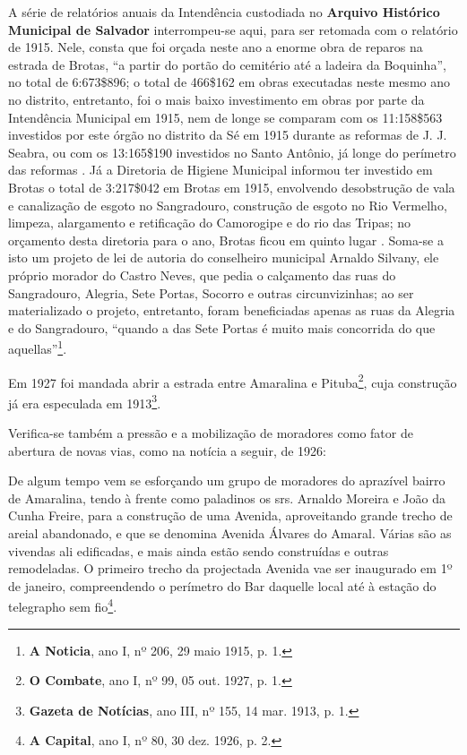 A série de relatórios anuais da Intendência custodiada no \textbf{Arquivo Histórico Municipal de Salvador} interrompeu-se aqui, para ser retomada com o relatório de 1915. Nele, consta que foi orçada neste ano a enorme obra de reparos na estrada de Brotas, “a partir do portão do cemitério até a ladeira da Boquinha”, no total de 6:673\$896; o total de 466\$162 em obras executadas neste mesmo ano no distrito, entretanto, foi o mais baixo investimento em obras por parte da Intendência Municipal em 1915, nem de longe se comparam com os 11:158\$563 investidos por este órgão no distrito da Sé em 1915 durante as reformas de J. J. Seabra, ou com os 13:165\$190 investidos no Santo Antônio, já longe do perímetro das reformas \cite[pp.~127-128]{salvador_relatorio_1916}. Já a Diretoria de Higiene Municipal informou ter investido em Brotas o total de 3:217\$042 em Brotas em 1915, envolvendo desobstrução de vala e canalização de esgoto no Sangradouro, construção de esgoto no Rio Vermelho, limpeza, alargamento e retificação do Camorogipe e do rio das Tripas; no orçamento desta diretoria para o ano, Brotas ficou em quinto lugar \cite[pp.~195-196]{salvador_relatorio_1916}. Soma-se a isto um projeto de lei de autoria do conselheiro municipal Arnaldo Silvany, ele próprio morador do Castro Neves, que pedia o calçamento das ruas do Sangradouro, Alegria, Sete Portas, Socorro e outras circunvizinhas; ao ser materializado o projeto, entretanto, foram beneficiadas apenas as ruas da Alegria e do Sangradouro, ``quando a das Sete Portas é muito mais concorrida do que aquellas''\footnote{\textbf{A Noticia}, ano I, nº 206, 29 maio 1915, p. 1.}.

Em 1927 foi mandada abrir a estrada entre Amaralina e Pituba\footnote{\textbf{O Combate}, ano I, nº 99, 05 out. 1927, p. 1.}, cuja construção já era especulada em 1913\footnote{\textbf{Gazeta de Notícias}, ano III, nº 155, 14 mar. 1913, p. 1.}.

Verifica-se também a pressão e a mobilização de moradores como fator de abertura de novas vias, como na notícia a seguir, de 1926:

\begin{citacao}
De algum tempo vem se esforçando um grupo de moradores do aprazível bairro de Amaralina, tendo à frente como paladinos os srs. Arnaldo Moreira e João da Cunha Freire, para a construção de uma Avenida, aproveitando grande trecho de areial abandonado, e que se denomina Avenida Álvares do Amaral.
Várias são as vivendas ali edificadas, e mais ainda estão sendo construídas e outras remodeladas.
O primeiro trecho da projectada Avenida vae ser inaugurado em 1º de janeiro, compreendendo o perímetro do Bar daquelle local até à estação do telegrapho sem fio\footnote{\textbf{A Capital}, ano I, nº 80, 30 dez. 1926, p. 2. }.
\end{citacao}

